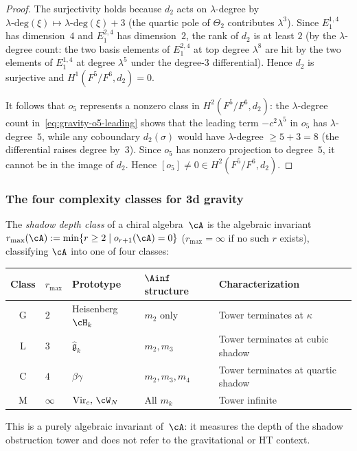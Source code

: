 \begin{proof}
The surjectivity holds because $d_2$ acts on $\lambda$-degree by
$\lambda\text{-deg}(\xi) \mapsto \lambda\text{-deg}(\xi) + 3$
(the quartic pole of $\Theta_2$ contributes $\lambda^3$).
Since $E_1^{1,4}$ has dimension~$4$ and $E_1^{2,4}$ has
dimension~$2$, the rank of $d_2$ is at least $2$ (by the
$\lambda$-degree count: the two basis elements of $E_1^{2,4}$
at top degree $\lambda^8$ are hit by the two elements of
$E_1^{1,4}$ at degree $\lambda^5$ under the degree-$3$
differential). Hence $d_2$ is surjective and
$H^1(F^5/F^6, d_2) = 0$.

It follows that $o_5$ represents a nonzero class in
$H^2(F^5/F^6, d_2)$: the $\lambda$-degree count
in~\eqref{eq:gravity-o5-leading} shows that the leading
term $-c^2\lambda^5$ in $o_5$ has $\lambda$-degree~$5$,
while any coboundary $d_2(\sigma)$ would have $\lambda$-degree
$\ge 5 + 3 = 8$ (the differential raises degree by~$3$).
Since $o_5$ has nonzero projection to degree~$5$, it cannot
be in the image of $d_2$.
Hence $[o_5] \ne 0 \in H^2(F^5/F^6, d_2)$.
\end{proof}

\subsubsection*{The four complexity classes for 3d gravity}

\begin{definition}
\label{def:gravity-shadow-depth-class}
The \emph{shadow depth class} of a chiral algebra~$\cA$ is the
algebraic invariant $r_{\max}(\cA)
:= \min\{r \ge 2 \mid o_{r+1}(\cA) = 0\}$
($r_{\max} = \infty$ if no such $r$ exists), classifying
$\cA$ into one of four classes:
\begin{center}
\small
\renewcommand{\arraystretch}{1.2}
\begin{tabular}{cllll}
\textbf{Class} & $r_{\max}$ & \textbf{Prototype}
 & \textbf{$\Ainf$ structure} & \textbf{Characterization} \\
\hline
G & $2$ & Heisenberg $\cH_k$
 & $m_2$ only & Tower terminates at $\kappa$ \\[2pt]
L & $3$ & $\hat{\mathfrak{g}}_k$
 & $m_2, m_3$ & Tower terminates at cubic shadow \\[2pt]
C & $4$ & $\beta\gamma$
 & $m_2, m_3, m_4$ & Tower terminates at quartic shadow \\[2pt]
M & $\infty$ & $\mathrm{Vir}_c,\,\cW_N$
 & All $m_k$ & Tower infinite
\end{tabular}
\end{center}
This is a purely algebraic invariant of~$\cA$: it measures the
depth of the shadow obstruction tower and does not refer to the
gravitational or HT context.
\end{definition}

